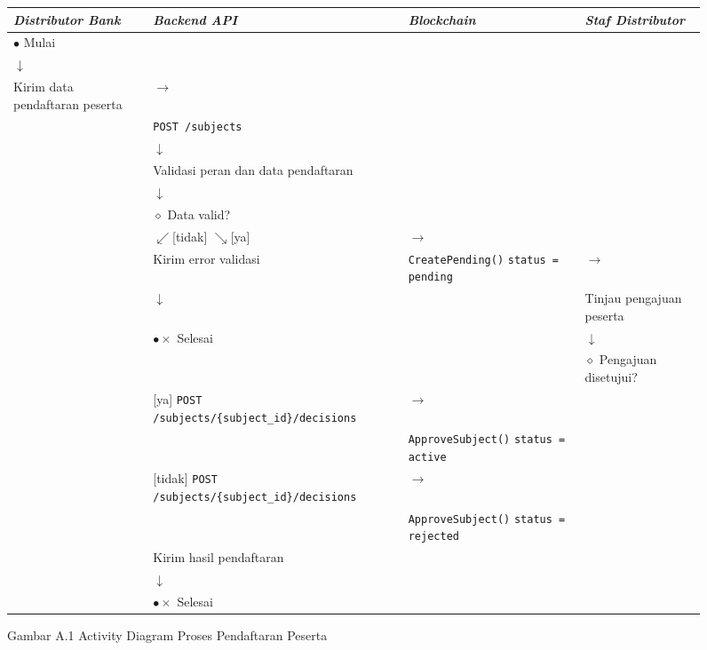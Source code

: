 \documentclass[12pt,a4paper]{article}
\begin{document}
\begin{figure}[H]
\centering
\caption{Gambar A.1 Activity Diagram Proses Pendaftaran Peserta}
\label{fig:ad01}
\begin{tabular}{@{}p{2.8cm}|p{3.4cm}|p{3.4cm}|p{3.2cm}@{}}
\textit{\textbf{Distributor Bank}} & \textit{\textbf{Backend API}} & \textit{\textbf{Blockchain}} & \textit{\textbf{Staf Distributor}} \\
\hline
$\bullet$ Mulai & & & \\
$\downarrow$ & & & \\
Kirim data pendaftaran peserta & $\rightarrow$ & & \\
& \texttt{POST /subjects} & & \\
& $\downarrow$ & & \\
& Validasi peran dan data pendaftaran & & \\
& $\downarrow$ & & \\
& $\diamond$ Data valid? & & \\
& $\swarrow$[tidak] \hspace{1cm} $\searrow$[ya] & $\rightarrow$ & \\
& Kirim error validasi & \texttt{CreatePending()} \newline \texttt{status = pending} & $\rightarrow$ \\
& $\downarrow$ & & Tinjau pengajuan peserta \\
& $\bullet\times$ Selesai & & $\downarrow$ \\
& & & $\diamond$ Pengajuan disetujui? \\
& [ya] \texttt{POST /subjects/\{subject\_id\}/decisions} & $\rightarrow$ & \\
& & \texttt{ApproveSubject()} \newline \texttt{status = active} & \\
& [tidak] \texttt{POST /subjects/\{subject\_id\}/decisions} & $\rightarrow$ & \\
& & \texttt{ApproveSubject()} \newline \texttt{status = rejected} & \\
& Kirim hasil pendaftaran & & \\
& $\downarrow$ & & \\
& $\bullet\times$ Selesai & & \\
\end{tabular}
\end{figure}
\end{document}
